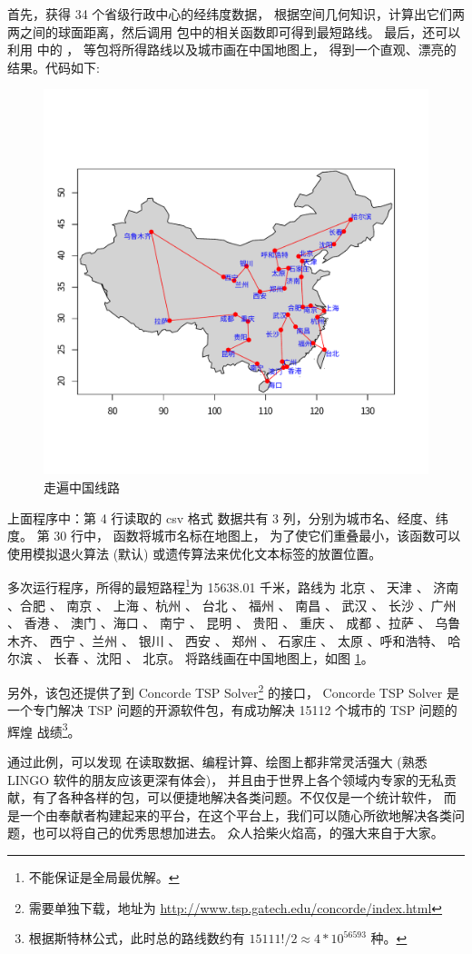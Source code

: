  首先，获得 34 个省级行政中心的经纬度数据，
 根据空间几何知识，计算出它们两两之间的球面距离，然后调用  包中的相关函数即可得到最短路线。
 最后，还可以利用 \R 中的 \citep{maps08}， \citep{maptools08}等包将所得路线以及城市画在中国地图上，
 得到一个直观、漂亮的结果。\R 代码如下:
 \begin{figure}[h]
\centering
\includegraphics[width=12cm]{./pic/china.pdf}
\caption{走遍中国线路}\label{fig:path_china}
\end{figure}

上面程序中：第 4 行读取的 csv 格式
数据共有 3 列，分别为城市名、经度、纬度。
第 30 行中， 函数将城市名标在地图上，
为了使它们重叠最小，该函数可以使用模拟退火算法 (默认) 或遗传算法来优化文本标签的放置位置。


多次运行程序，所得的最短路程\footnote{不能保证是全局最优解。}为 15638.01 千米，路线为
北京    、 天津    、 济南 、合肥    、 南京    、 上海 、杭州    、 台北    、 福州 、
南昌    、 武汉    、 长沙 、广州    、 香港    、 澳门 、海口    、 南宁    、 昆明 、
贵阳    、 重庆    、 成都 、拉萨    、 乌鲁木齐、 西宁 、兰州    、 银川    、 西安 、
郑州    、 石家庄  、 太原 、呼和浩特、 哈尔滨  、 长春 、沈阳    、 北京。
将路线画在中国地图上，如图 \ref{fig:path_china}。


另外，该包还提供了到 Concorde TSP Solver\footnote{需要单独下载，地址为 \url{http://www.tsp.gatech.edu/concorde/index.html}} 的接口，
Concorde TSP Solver 是一个专门解决 TSP 问题的开源软件包，有成功解决 15112 个城市的 TSP 问题的辉煌
战绩\footnote{根据斯特林公式，此时总的路线数约有 $15111!/2\approx4*10^{56593}$ 种。}。


通过此例，可以发现 \R 在读取数据、编程计算、绘图上都非常灵活强大 (熟悉 LINGO 软件的朋友应该更深有体会)，
并且由于世界上各个领域内专家的无私贡献，\R 有了各种各样的包，可以便捷地解决各类问题。\R 不仅仅是一个统计软件，
而是一个由奉献者构建起来的平台，在这个平台上，我们可以随心所欲地解决各类问题，也可以将自己的优秀思想加进去。
众人拾柴火焰高，\R 的强大来自于大家。
